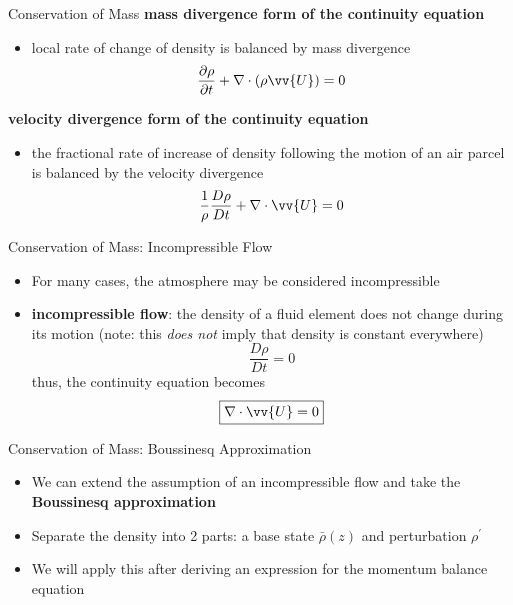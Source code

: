 \begin{frame}{Conservation of Mass}
\textbf{mass divergence form of the continuity equation}
\begin{itemize}
	\item local rate of change of density is balanced by mass divergence
	$$\frac{\partial \rho}{\partial t} + \nabla \cdot (\rho \vv{U}) = 0$$
\end{itemize}
\textbf{velocity divergence form of the continuity equation}
\begin{itemize}
	\item the fractional rate of increase of density following the motion of an air parcel is balanced by the velocity divergence
	$$\frac{1}{\rho}\frac{D\rho}{Dt} + \nabla \cdot \vv{U} = 0$$
\end{itemize}
\end{frame}
\begin{frame}{Conservation of Mass: Incompressible Flow}
\begin{itemize}
	\item For many cases, the atmosphere may be considered incompressible
	\item \textbf{incompressible flow}: the density of a fluid element does not change during its motion (note: this \textit{does not} imply that density is constant everywhere)
	$$\frac{D\rho}{Dt} = 0$$
	thus, the continuity equation becomes
	$$\boxed{\nabla \cdot \vv{U} = 0}$$
\end{itemize}
\end{frame}
\begin{frame}{Conservation of Mass: Boussinesq Approximation}
\begin{itemize}
	\item We can extend the assumption of an incompressible flow and take the \textbf{Boussinesq approximation}
	\item Separate the density into 2 parts: a base state $\bar \rho (z)$ and perturbation $\rho^\prime$
	\item We will apply this after deriving an expression for the momentum balance equation
\end{itemize}
\end{frame}

